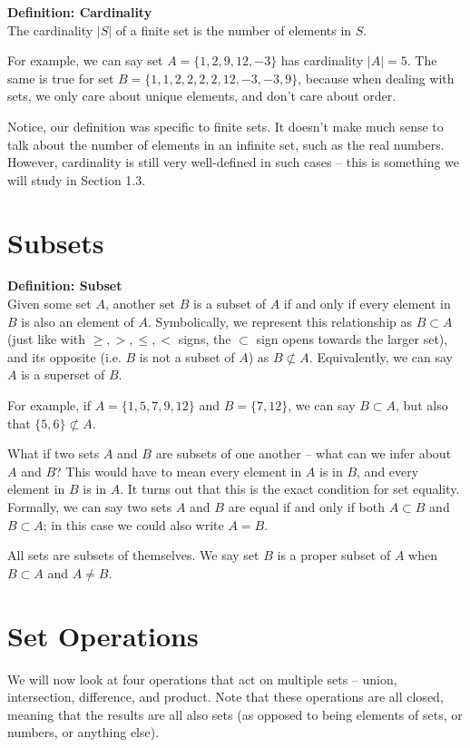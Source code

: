 \documentclass{article}
\begin{document}
\textbf{Definition: Cardinality} \\
The cardinality $|S|$ of a finite set is the number of elements in $S$.

For example, we can say set $A = \{1, 2, 9, 12, -3\}$ has cardinality $|A| = 5$. The same is true for set $B = \{1, 1, 2, 2, 2, 2, 12, -3, -3, 9\}$, because when dealing with sets, we only care about unique elements, and don’t care about order.

Notice, our definition was specific to finite sets. It doesn’t make much sense to talk about the number of elements in an infinite set, such as the real numbers. However, cardinality is still very well-defined in such cases -- this is something we will study in Section 1.3.

\section*{Subsets}

\textbf{Definition: Subset} \\
Given some set $A$, another set $B$ is a subset of $A$ if and only if every element in $B$ is also an element of $A$. Symbolically, we represent this relationship as $B \subset A$ (just like with $\geq, >, \leq, <$ signs, the $\subset$ sign opens towards the larger set), and its opposite (i.e. $B$ is not a subset of $A$) as $B \not\subset A$. Equivalently, we can say $A$ is a superset of $B$.

For example, if $A = \{1, 5, 7, 9, 12\}$ and $B = \{7, 12\}$, we can say $B \subset A$, but also that $\{5, 6\} \not\subset A$.

What if two sets $A$ and $B$ are subsets of one another -- what can we infer about $A$ and $B$? This would have to mean every element in $A$ is in $B$, and every element in $B$ is in $A$. It turns out that this is the exact condition for set equality. Formally, we can say two sets $A$ and $B$ are equal if and only if both $A \subset B$ and $B \subset A$; in this case we could also write $A = B$.

All sets are subsets of themselves. We say set $B$ is a proper subset of $A$ when $B \subset A$ and $A \neq B$.

\section*{Set Operations}

We will now look at four operations that act on multiple sets -- union, intersection, difference, and product. Note that these operations are all closed, meaning that the results are all also sets (as opposed to being elements of sets, or numbers, or anything else).
\end{document}
